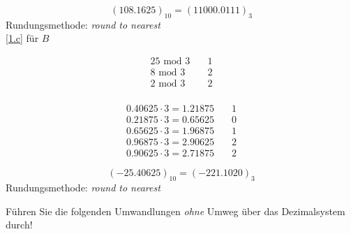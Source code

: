 \documentclass[a4paper, margins=3cm, newpage]{homework}
\begin{document}
\begin{solution}
\[(108.1625)_{10} = (11000.0111)_3\]
Rundungsmethode: \emph{round to nearest} \\

\ref{1.c} für \(B\) \\
\begin{minipage}{0.5\textwidth}
\begin{align*}
	25 \text{ mod } 3 \quad &1 \\
	8 \text{ mod } 3 \quad &2 \\ 
	2 \text{ mod } 3 \quad &2 \\
\end{align*}
\end{minipage}
\begin{minipage}{0.5\textwidth}
\begin{align*}
	0.40625 \cdot 3 = 1.21875 \quad & 1 \\
	0.21875 \cdot 3 = 0.65625 \quad & 0 \\ 
	0.65625 \cdot 3 = 1.96875\quad & 1 \\ 
	0.96875 \cdot 3 = 2.90625 \quad & 2 \\ 
	0.90625 \cdot 3 = 2.71875 \quad & 2
\end{align*}
\end{minipage}

\[(-25.40625)_{10} = (-221.1020)_3\]
Rundungsmethode: \emph{round to nearest}

\end{solution}

\begin{problem}
Führen Sie die folgenden Umwandlungen \emph{ohne} Umweg über das Dezimalsystem durch!
\end{problem}
\end{document}

